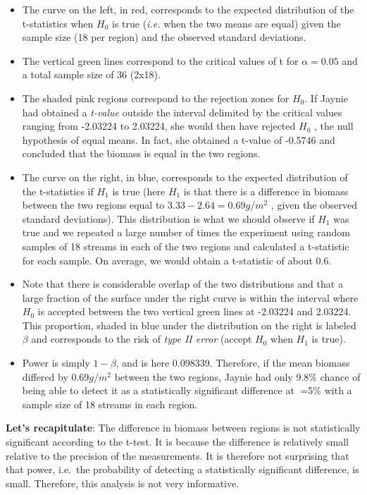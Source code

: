 \documentclass[
  12pt,
]{book}
\providecommand{\tightlist}{%
  \setlength{\itemsep}{0pt}\setlength{\parskip}{0pt}}
\begin{document}
\begin{itemize}
\tightlist
\item
  The curve on the left, in red, corresponds to the expected distribution of the t-statistics when \(H_0\) is true (\emph{i.e.} when the two means are equal) given the sample size (18 per region) and the observed standard deviations.
\item
  The vertical green lines correspond to the critical values of t for \(\alpha = 0.05\) and a total sample size of 36 (2x18).
\item
  The shaded pink regions correspond to the rejection zones for \(H_0\). If Jaynie had obtained a \emph{t-value} outside the interval delimited by the critical values ranging from -2.03224 to 2.03224, she would then have rejected \(H_0\) , the null hypothesis of equal means. In fact, she obtained a t-value of -0.5746 and concluded that the biomass is equal in the two regions.
\item
  The curve on the right, in blue, corresponds to the expected distribution of the t-statistics if \(H_1\) is true (here \(H_1\) is that there is a difference in biomass between the two regions equal to \(3.33 - 2.64 = 0.69 g/m^2\) , given the observed standard deviations). This distribution is what we should observe if \(H_1\) was true and we repeated a large number of times the experiment using random samples of 18 streams in each of the two regions and calculated a t-statistic for each sample. On average, we would obtain a t-statistic of about 0.6.
\item
  Note that there is considerable overlap of the two distributions and that a large fraction of the surface under the right curve is within the interval where \(H_0\) is accepted between the two vertical green lines at -2.03224 and 2.03224. This proportion, shaded in blue under the distribution on the right is labeled \(\beta\) and corresponds to the risk of \emph{type II error} (accept \(H_0\) when \(H_1\) is true).
\item
  Power is simply \(1-\beta\), and is here 0.098339. Therefore, if the mean biomass differed by \(0.69 g/m^2\) between the two regions, Jaynie had only 9.8\% chance of being able to detect it as a statistically significant difference at =5\% with a sample size of 18 streams in each region.
\end{itemize}

\textbf{Let's recapitulate}: The difference in biomass between regions is not statistically significant according to the t-test. It is because the difference is relatively small relative to the precision of the measurements. It is therefore not surprising that that power, i.e.~the probability of detecting a statistically significant difference, is small. Therefore, this analysis is not very informative.
\end{document}
